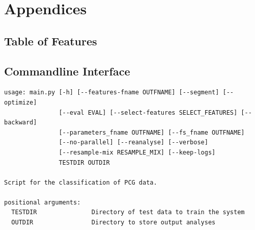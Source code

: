 \documentclass[titlepage, 12pt]{scrartcl} \usepackage{enumitem}
\begin{document}
\appendix
\section*{Appendices}
\renewcommand{\thesubsection}{\Alph{subsection}}
\subsection{Table of Features}\label{appendixA}
\subsection{Commandline Interface}
\singlespacing
\lstset{basicstyle=\scriptsize, style=mystyle}
\begin{lstlisting}[numbers=none]
usage: main.py [-h] [--features-fname OUTFNAME] [--segment] [--optimize]
               [--eval EVAL] [--select-features SELECT_FEATURES] [--backward]
               [--parameters_fname OUTFNAME] [--fs_fname OUTFNAME]
               [--no-parallel] [--reanalyse] [--verbose]
               [--resample-mix RESAMPLE_MIX] [--keep-logs]
               TESTDIR OUTDIR

Script for the classification of PCG data.

positional arguments:
  TESTDIR               Directory of test data to train the system
  OUTDIR                Directory to store output analyses


\end{lstlisting}
\end{document}
